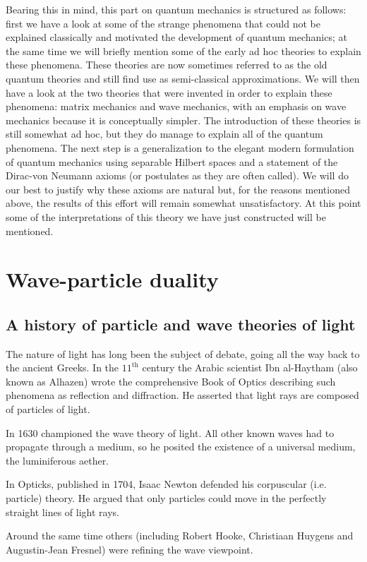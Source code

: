 Bearing this in mind, this part on quantum mechanics is structured as follows: first we have a look at some of the strange phenomena that could not be explained classically and motivated the development of quantum mechanics; at the same time we will briefly mention some of the early ad hoc theories to explain these phenomena. These theories are now sometimes referred to as the old quantum theories and still find use as semi-classical approximations. We will then have a look at the two theories that were invented in order to explain these phenomena: matrix mechanics and wave mechanics, with an emphasis on wave mechanics because it is conceptually simpler. The introduction of these theories is still somewhat ad hoc, but they do manage to explain all of the quantum phenomena. The next step is a generalization to the elegant modern formulation of quantum mechanics using separable Hilbert spaces and a statement of the Dirac-von Neumann axioms (or postulates as they are often called). We will do our best to justify why these axioms are natural but, for the reasons mentioned above, the results of this effort will remain somewhat unsatisfactory. At this point some of the interpretations of this theory we have just constructed will be mentioned.
\section{Wave-particle duality}
\subsection{A history of particle and wave theories of light}
The nature of light has long been the subject of debate, going all the way back to the ancient Greeks. In the $11^\text{th}$ century the Arabic scientist Ibn al-Haytham (also known as Alhazen) wrote the comprehensive Book of Optics describing such phenomena as reflection and diffraction. He asserted that light rays are composed of particles of light.

In 1630 championed the wave theory of light. All other known waves had to propagate through a medium, so he posited the existence of a universal medium, the luminiferous aether.

In Opticks, published in 1704, Isaac Newton defended his corpuscular (i.e. particle) theory. He argued that only particles could move in the perfectly straight lines of light rays.

Around the same time others (including Robert Hooke, Christiaan Huygens and Augustin-Jean Fresnel) were refining the wave viewpoint.

